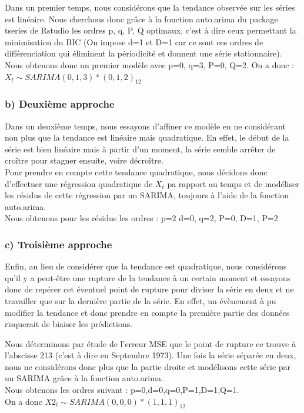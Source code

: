 \documentclass[12pt,a4paper]{book}
\newcommand{\1}{\mathds{1}}
\begin{document}
Dans un premier temps, nous considérons que la tendance observée sur les séries est linéaire. Nous cherchons donc grâce à la fonction auto.arima du package tseries de Rstudio les ordres p, q, P, Q optimaux, c'est à dire ceux permettant la minimisation du BIC (On impose d=1 et D=1 car ce sont ces ordres de différenciation qui éliminent la périodicité et donnent une série stationnaire).
\noindent
Nous obtenons donc un premier modèle avec p=0, q=3, P=0, Q=2. On a donc : 
$X_t \sim SARIMA(0,1,3)*(0,1,2)_{12}$
\subsubsection{b) Deuxième approche}

Dans un deuxième temps, nous essayons d'affiner ce modèle en ne considérant non plus que la tendance est linéaire mais quadratique. En effet, le début de la série est bien linéaire mais à partir d'un moment, la série semble arrêter de croître pour stagner ensuite, voire décroître. \\
Pour prendre en compte cette tendance quadratique, nous décidons donc d'effectuer une régression quadratique de $X_t$ pa rapport au temps et de modéliser les résidus de cette régression par un SARIMA, toujours à l'aide de la fonction auto.arima.\\
Nous obtenons pour les résidus les ordres : p=2 d=0, q=2, P=0, D=1, P=2
  
\subsubsection{c) Troisième approche}
Enfin, au lieu de considérer que la tendance est quadratique, nous considérons qu'il y a peut-être une rupture de la tendance à un certain moment et essayons donc de repérer cet éventuel point de rupture pour diviser la série en deux et ne travailler que sur la dernière partie de la série. En effet, un évènement à pu modifier la tendance et donc prendre en compte la première partie des données risquerait de biaiser les prédictions.

\vspace{5 mm}
\noindent
Nous déterminons par étude de l'erreur MSE que le point de rupture ce trouve à l'abscisse 213 (c'est à dire en Septembre 1973). Une fois la série séparée en deux, nous ne considérons donc plus que la partie droite et modélisons cette série par un SARIMA grâce à la fonction auto.arima.\\
Nous obtenons les ordres suivant : p=0,d=0,q=0,P=1,D=1,Q=1.\\
On a donc $X2_t \sim SARIMA(0,0,0)*(1,1,1)_{12}$
\end{document}

